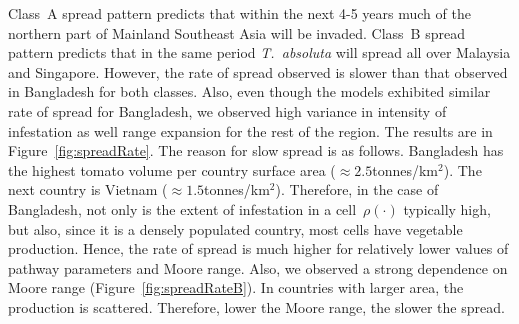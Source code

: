 \documentclass[11pt]{article}
\newcommand{\tuta}{\emph{T.~absoluta}}
\newcommand{\infest}{\rho}
\theoremstyle{definition}
\begin{document}
Class~A spread pattern predicts that within the next 4-5 years much of
the northern part of Mainland Southeast Asia will be invaded. Class~B
spread pattern predicts that in the same period \tuta{} will spread all
over Malaysia and Singapore. 
However, the rate of spread observed is slower than that observed in Bangladesh for
both classes. Also, even though the models exhibited similar rate of spread
for Bangladesh, we observed high variance in intensity of infestation as
well range expansion for the rest of the region. The results are in
Figure~\ref{fig:spreadRate}. The reason for slow spread is as follows.
Bangladesh has the highest tomato volume per country surface area
($\approx2.5$tonnes/km$^2$).  The next country is Vietnam
($\approx1.5$tonnes/km$^2$). Therefore, in the case of Bangladesh, not only
is the extent of infestation in a cell~$\infest(\cdot)$ typically high, but
also, since it is a densely populated country, most cells have vegetable
production. Hence, the rate of spread is much higher for relatively lower
values of pathway parameters and Moore range. Also, we observed a strong
dependence on Moore range (Figure~\ref{fig:spreadRateB}). In countries with
larger area, the production is scattered. Therefore, lower the Moore range,
the slower the spread.
\end{document}
